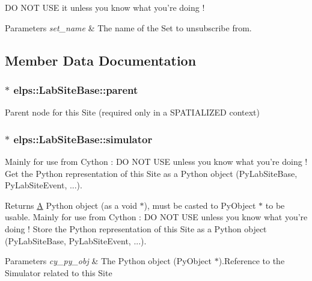 D\+O N\+O\+T U\+S\+E it unless you know what you're doing !


\begin{DoxyParams}{Parameters}
{\em set\+\_\+name} & The name of the Set to unsubscribe from. \\
\hline
\end{DoxyParams}


\subsection{Member Data Documentation}
\hypertarget{classelps_1_1_lab_site_base_a51cd67cf2970d70ea331e37ff5b77a44}{
\subsubsection[{parent}]{$\ast$ elps\+::\+Lab\+Site\+Base\+::parent}}\label{classelps_1_1_lab_site_base_a51cd67cf2970d70ea331e37ff5b77a44}
Parent node for this Site (required only in a S\+P\+A\+T\+I\+A\+L\+I\+Z\+E\+D context) \hypertarget{classelps_1_1_lab_site_base_a5b8dbbdad3e4484493203bf2b89b3878}{
\subsubsection[{simulator}]{$\ast$ elps\+::\+Lab\+Site\+Base\+::simulator\hspace{0.3cm}{\ttfamily [protected]}}}\label{classelps_1_1_lab_site_base_a5b8dbbdad3e4484493203bf2b89b3878}
Mainly for use from Cython \+: D\+O N\+O\+T U\+S\+E unless you know what you're doing ! Get the Python representation of this Site as a Python object (Py\+Lab\+Site\+Base, Py\+Lab\+Site\+Event, ...).

\begin{DoxyReturn}{Returns}
\hyperlink{class_a}{A} Python object (as a void $\ast$), must be casted to Py\+Object $\ast$ to be usable. Mainly for use from Cython \+: D\+O N\+O\+T U\+S\+E unless you know what you're doing ! Store the Python representation of this Site as a Python object (Py\+Lab\+Site\+Base, Py\+Lab\+Site\+Event, ...).
\end{DoxyReturn}

\begin{DoxyParams}{Parameters}
{\em cy\+\_\+py\+\_\+obj} & The Python object (Py\+Object $\ast$).Reference to the Simulator related to this Site \\
\hline
\end{DoxyParams}
